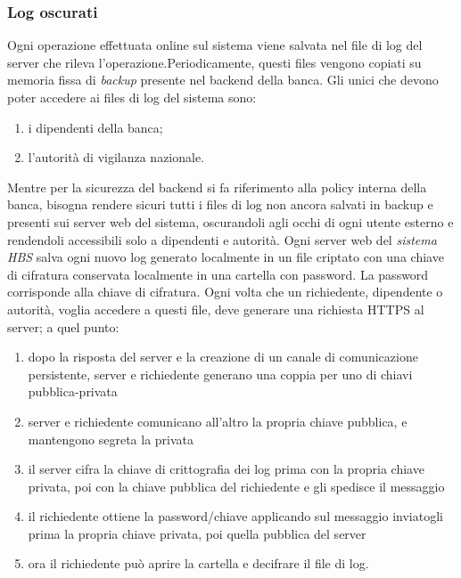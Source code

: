	\subsubsection{Log oscurati}
Ogni operazione effettuata online sul sistema viene salvata nel file di log del server che rileva l'operazione.Periodicamente, questi files vengono copiati su memoria fissa di \emph{backup} presente nel backend della banca.
Gli unici che devono poter accedere ai files di log del sistema sono:
\begin{enumerate}
\item i dipendenti della banca;
\item l'autorità di vigilanza nazionale.
\end{enumerate}
Mentre per la sicurezza del backend si fa riferimento alla policy interna della banca, bisogna rendere sicuri tutti i files di log non ancora salvati in backup e presenti sui server web del sistema, oscurandoli agli occhi di ogni utente esterno e rendendoli accessibili solo a dipendenti e autorità.
Ogni server web del \emph{sistema HBS} salva ogni nuovo log generato localmente in un file criptato con una chiave di cifratura conservata localmente in una cartella con password.
La password corrisponde alla chiave di cifratura.
\linebreak
 Ogni volta che un richiedente, dipendente o autorità, voglia accedere a questi file, deve generare una richiesta HTTPS al server; a quel punto:
 \begin{enumerate}
 \item dopo la risposta del server e la creazione di un canale di comunicazione persistente, server e richiedente generano una coppia per uno di chiavi pubblica-privata
 \item server e richiedente comunicano all'altro la propria chiave pubblica, e mantengono segreta la privata
 \item il server cifra la chiave di crittografia dei log prima con la propria chiave privata, poi con la chiave pubblica del richiedente e gli spedisce il messaggio
 \item il richiedente ottiene la password/chiave applicando sul messaggio inviatogli prima la propria chiave privata, poi quella pubblica del server
 \item ora il richiedente può aprire la cartella e decifrare il file di log.
 \end{enumerate}











